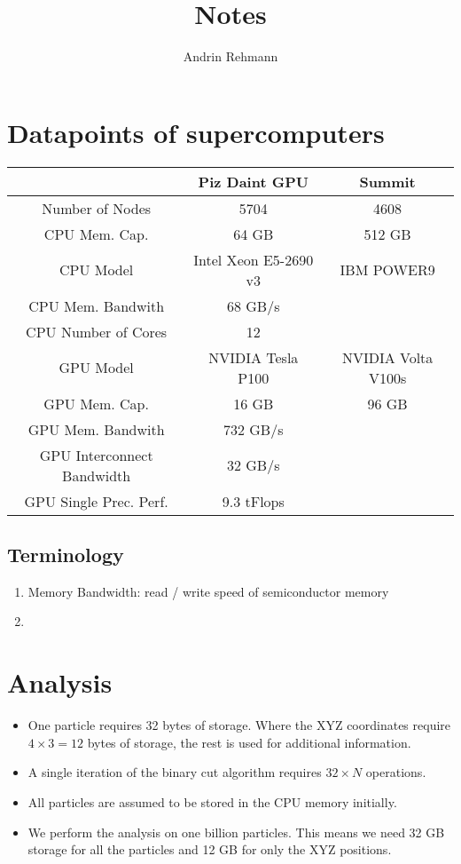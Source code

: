 \documentclass[]{article}
\title{Notes}
\author{Andrin Rehmann}
\begin{document}
\maketitle

\section{Datapoints of supercomputers}

\begin{center}
	\begin{tabular}{ c c c }
		& Piz Daint GPU \cite{piz_daint} & Summit \\ 
		\hline
		Number of Nodes & 5704 & 4608\\
		CPU Mem. Cap. & 64 GB & 512 GB  \\   
		CPU Model & Intel Xeon E5-2690 v3 & IBM POWER9 \\
		CPU Mem. Bandwith  & 68 GB/s \\
		CPU Number of Cores & 12 \\
		GPU Model & NVIDIA Tesla P100 & NVIDIA Volta V100s \\
		GPU Mem. Cap. & 16 GB & 96 GB\\
		GPU Mem. Bandwith & 732 GB/s \\
		GPU Interconnect Bandwidth & 32 GB/s \\
		GPU Single Prec. Perf. & 9.3 tFlops
	\end{tabular}
\end{center}

\subsection{Terminology}

\begin{enumerate}
	\item Memory Bandwidth: read / write speed of semiconductor memory
	\item 

\end{enumerate}

\section{Analysis}

\begin{itemize}
	\item 
	One particle requires 32 bytes of storage. Where the XYZ coordinates require $4\times3 = 12$ bytes of storage, the rest is used for additional information.
	
	\item
	A single iteration of the binary cut algorithm requires $32 \times N$ operations.
	
	\item 
	All particles are assumed to be stored in the CPU memory initially.
	
	\item
	We perform the analysis on one billion particles. This means we need 32 GB storage for all the particles and 12 GB for only the XYZ positions.
\end{itemize}
\end{document}
